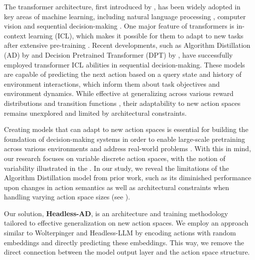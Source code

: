 The transformer architecture, first introduced by \citet{vaswani2017attention}, has been widely adopted in key areas of machine learning, including natural language processing \citep{radford2018improving, devlin2018bert}, computer vision \citep{dosovitskiy2020image} and sequential decision-making \citep{chen2021decision}. One major feature of transformers is in-context learning (ICL), which makes it possible for them to adapt to new tasks after extensive pre-training \citep{brown2020language, liu2023pre}. Recent developments, such as Algorithm Distillation (AD) by \citet{laskin2022context} and Decision Pretrained Transformer (DPT) by \citet{lee2023supervised}, have successfully employed transformer ICL abilities in sequential decision-making. These models are capable of predicting the next action based on a query state and history of environment interactions, which inform them about task objectives and environment dynamics. While effective at generalizing across various reward distributions \citep{laskin2022context, lee2023supervised} and transition functions \citep{raparthy2023generalization}, their adaptability to new action spaces remains unexplored and limited by architectural constraints.

Creating models that can adapt to new action spaces is essential for building the foundation of decision-making systems in order to enable large-scale pretraining across various environments and address real-world problems \citep{jain2020generalization, chandak2020lifelong, london2020offline, jain2021know}. With this in mind, our research focuses on variable discrete action spaces, with the notion of variability illustrated in the . In our study, we reveal the limitations of the Algorithm Distillation model from prior work, such as its diminished performance upon changes in action semantics as well as architectural constraints when handling varying action space sizes (see ). 


Our solution, \textbf{Headless-AD}, is an architecture and training methodology tailored to effective generalization on new action spaces. We employ an approach similar to Wolterpinger \citep{dulac2015deep} and Headless-LLM \citep{godey2023headless} by encoding actions with random embeddings \citep{kirsch2023towards} and directly predicting these embeddings. This way, we remove the direct connection between the model output layer and the action space structure. 

